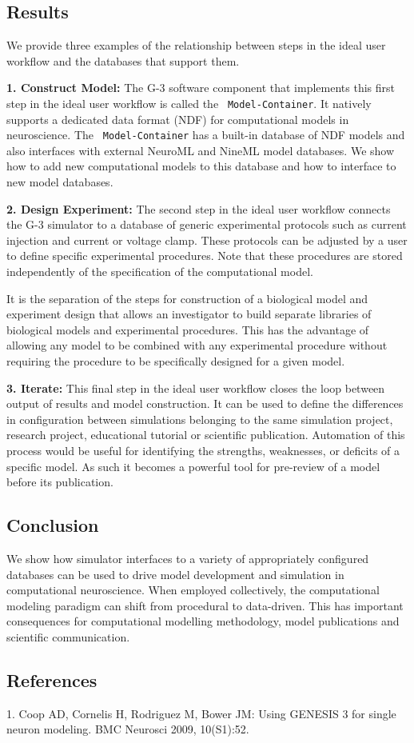 \documentclass[12pt]{article}
\begin{document}
\subsection*{Results}

We provide three examples of the relationship between steps in the
ideal user workflow and the databases that support them.

{\bf 1. Construct Model:} The G-3 software component that implements
this first step in the ideal user workflow is called the {\tt
  Model-Container}.  It natively supports a dedicated data format
(NDF) for computational models in neuroscience.  The {\tt
  Model-Container} has a built-in database of NDF models and also
interfaces with external NeuroML and NineML model databases.  We show
how to add new computational models to this database and how to
interface to new model databases.

{\bf 2. Design Experiment:} The second step in the ideal user workflow
connects the G-3 simulator to a database of generic experimental
protocols such as current injection and current or voltage clamp.
These protocols can be adjusted by a user to define specific
experimental procedures.  Note that these procedures are stored
independently of the specification of the computational model.

It is the separation of the steps for construction of a biological
model and experiment design that allows an investigator to build
separate libraries of biological models and experimental procedures.
This has the advantage of allowing any model to be combined with any
experimental procedure without requiring the procedure to be
specifically designed for a given model.

{\bf 3. Iterate:} This final step in the ideal user workflow closes
the loop between output of results and model construction.  It can be
used to define the differences in configuration between simulations
belonging to the same simulation project, research project,
educational tutorial or scientific publication. Automation of this
process would be useful for identifying the strengths, weaknesses, or
deficits of a specific model.  As such it becomes a powerful tool for
pre-review of a model before its publication.

\subsection*{Conclusion}

We show how simulator interfaces to a variety of appropriately
configured databases can be used to drive model development and
simulation in computational neuroscience.  When employed collectively,
the computational modeling paradigm can shift from procedural to
data-driven.  This has important consequences for computational
modelling methodology, model publications and scientific
communication.


\subsection*{References}
1. Coop AD, Cornelis H, Rodriguez M, Bower JM: Using GENESIS 3 for single neuron modeling. BMC Neurosci 2009, 10(S1):52.
\end{document}
